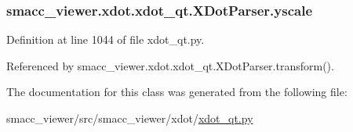 \subsubsection[{\texorpdfstring{yscale}{yscale}}]{\setlength{\rightskip}{0pt plus 5cm}smacc\+\_\+viewer.\+xdot.\+xdot\+\_\+qt.\+X\+Dot\+Parser.\+yscale}\hypertarget{classsmacc__viewer_1_1xdot_1_1xdot__qt_1_1XDotParser_a595f33b40408c747ff5bf18728a26b1b}{}\label{classsmacc__viewer_1_1xdot_1_1xdot__qt_1_1XDotParser_a595f33b40408c747ff5bf18728a26b1b}


Definition at line 1044 of file xdot\+\_\+qt.\+py.



Referenced by smacc\+\_\+viewer.\+xdot.\+xdot\+\_\+qt.\+X\+Dot\+Parser.\+transform().



The documentation for this class was generated from the following file\+:\begin{DoxyCompactItemize}
\item 
smacc\+\_\+viewer/src/smacc\+\_\+viewer/xdot/\hyperlink{xdot__qt_8py}{xdot\+\_\+qt.\+py}\end{DoxyCompactItemize}
